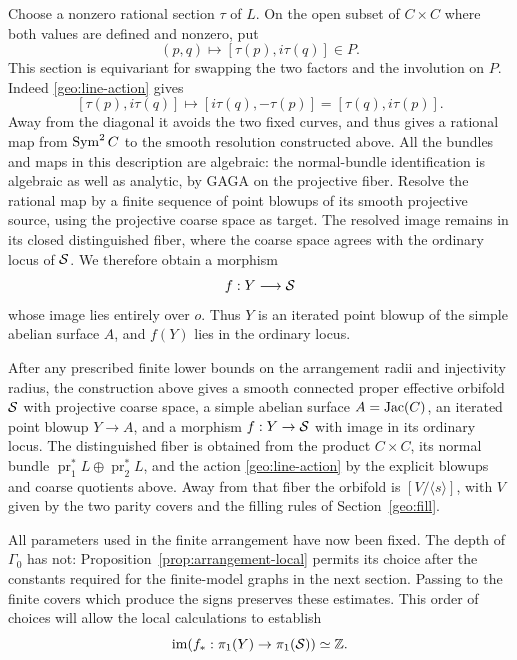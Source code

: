 Choose a nonzero rational section $\tau$ of $L$.  On the open subset
of $C\times C$ where both values are defined and nonzero, put
\begin{equation}\label{geo:rational-section}
                 (p,q)\longmapsto[\tau(p),i\tau(q)]\in P.
\end{equation}
This section is equivariant for swapping the two factors and the
involution on $P$.  Indeed \eqref{geo:line-action} gives
\[
       [\tau(p),i\tau(q)]\longmapsto[i\tau(q),-\tau(p)]
                            =[\tau(q),i\tau(p)].
\]
Away from the diagonal it avoids the two fixed curves, and thus gives
a rational map from $\operatorname{Sym}^2C$ to the smooth resolution constructed
above.  All the bundles and maps in this description are algebraic:
the normal-bundle identification is algebraic as well as analytic,
by GAGA on the projective fiber.  Resolve the rational map by a finite
sequence of point blowups of its smooth projective source, using the
projective coarse space as target.  The resolved image remains in its
closed distinguished fiber, where the coarse space agrees with the
ordinary locus of $\mathcal S$.  We therefore obtain a morphism
\begin{equation}\label{geo:Ymap}
                        f:Y\longrightarrow\mathcal S
\end{equation}
whose image lies entirely over $o$.  Thus $Y$ is an iterated point
blowup of the simple abelian surface $A$, and $f(Y)$ lies in the
ordinary locus.

\begin{proposition}\label{prop:orbifold-surface}
After any prescribed finite lower bounds on the arrangement radii and
injectivity radius, the construction above gives a smooth connected
proper effective orbifold $\mathcal S$ with projective coarse space, a simple
abelian surface $A=\operatorname{Jac}(C)$, an iterated point blowup $Y\to A$, and a
morphism $f:Y\to\mathcal S$ with image in its ordinary locus.  The distinguished
fiber is obtained from the product $C\times C$, its normal bundle
$\operatorname{pr}_1^*L\oplus\operatorname{pr}_2^*L$, and the action
\eqref{geo:line-action} by the explicit blowups and coarse quotients
above.  Away from that fiber the orbifold is $[V/\langle s\rangle]$,
with $V$ given by the two parity covers and the filling rules of
Section~\ref{geo:fill}.
\end{proposition}

All parameters used in the finite arrangement have now been fixed.
The depth of $\Gamma_0$ has not: Proposition~\ref{prop:arrangement-local}
permits its choice after the constants required for the finite-model
graphs in the next section.  Passing to the finite covers which produce
the signs preserves these estimates.  This order of choices will
allow the local calculations to establish
\[
                    \operatorname{im}(f_*:\pi_1(Y)\to\pi_1(\mathcal S))\simeq\mathbb Z.
\]
